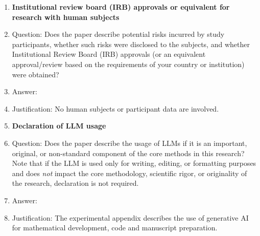 \begin{enumerate}
\item {\bf Institutional review board (IRB) approvals or equivalent for research with human subjects}
    \item[] Question: Does the paper describe potential risks incurred by study participants, whether such risks were disclosed to the subjects, and whether Institutional Review Board (IRB) approvals (or an equivalent approval/review based on the requirements of your country or institution) were obtained?
    \item[] Answer: \answerNA{}
    \item[] Justification: No human subjects or participant data are involved.


\item {\bf Declaration of LLM usage}
    \item[] Question: Does the paper describe the usage of LLMs if it is an important, original, or non-standard component of the core methods in this research? Note that if the LLM is used only for writing, editing, or formatting purposes and does \emph{not} impact the core methodology, scientific rigor, or originality of the research, declaration is not required.
    \item[] Answer: \answerYes{}
    \item[] Justification: The experimental appendix describes the use of generative AI for mathematical development, code and manuscript preparation.


\end{enumerate}
